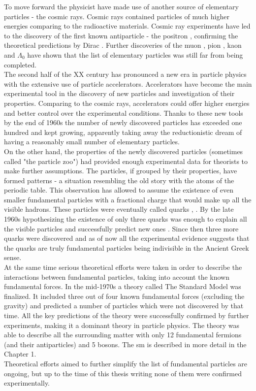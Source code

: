 To move forward the physicist have made use of another source of elementary particles - the cosmic rays. Cosmic rays contained particles of much higher energies comparing to the radioactive materials. Cosmic ray experiments have led to the discovery of the first known antiparticle - the positron \cite{positron_exp}, confirming the theoretical predictions by Dirac \cite{positron_th}. Further discoveries of the muon \cite{muon_exp}, pion \cite{pion}, kaon \cite{kaon} and $\Lambda_0$ \cite{lambda0} have shown that the list of elementary particles was still far from being completed. \\
The second half of the XX century has pronounced a new era in particle physics with the extensive use of particle accelerators. Accelerators have become the main experimental tool in the discovery of new particles and investigation of their properties. Comparing to the cosmic rays, accelerators could offer higher energies and better control over the experimental conditions. Thanks to these new tools by the end of 1960s the number of newly discovered particles has exceeded one hundred and kept growing, apparently taking away the reductionistic dream of having a reasonably small number of elementary particles. \\
On the other hand, the properties of the newly discovered particles (sometimes called "the particle zoo") had provided enough experimental data for theorists to make further assumptions. The particles, if grouped by their properties, have formed patterns - a situation resembling the old story with the atoms of the periodic table. This observation has allowed to assume the existence of even smaller fundamental particles with a fractional charge that would make up all the visible hadrons. These particles were eventually called quarks \cite{gellMann}, \cite{zweig}. By the late 1960s hypothesizing the existence of only three quarks was enough to explain all the visible particles and successfully predict new ones \cite{omega}. Since then three more quarks were discovered and as of now all the experimental evidence suggests that the quarks are truly fundamental particles being indivisible in the Ancient Greek sense. \\
At the same time serious theoretical efforts were taken in order to describe the interactions between fundamental particles, taking into account the known fundamental forces. In the mid-1970s a theory called The Standard Model was finalized. It included three out of four known fundamental forces (excluding the gravity) and predicted a number of particles which were not discovered by that time. All the key predictions of the theory were successfully confirmed by further experiments, making it a dominant theory in particle physics. The theory was able to describe all the surrounding matter with only 12 fundamental fermions (and their antiparticles) and 5 bosons. The \gls{sm} is described in more detail in the Chapter 1.\\
Theoretical efforts aimed to further simplify the list of fundamental particles are ongoing, but up to the time of this thesis writing none of them were confirmed experimentally. 
